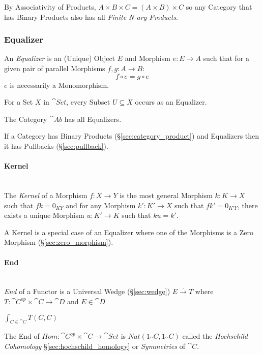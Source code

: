 By Associativity of Products, $A \times B \times C = (A \times B)
\times C$ so any Category that has Binary Products also has all
\emph{Finite N-ary Products}.



\subsubsection{Equalizer}\label{sec:equalizer}

An \emph{Equalizer} is an (Unique) Object $E$ and Morphism $e: E
\rightarrow A$ such that for a given pair of parallel Morphisms $f,g :
A \rightarrow B$:
\[
  f \circ e = g \circ e
\]
$e$ is necessarily a Monomorphism.

For a Set $X$ in $\cat{Set}$, every Subset $U \subseteq X$ occurs
as an Equalizer.

The Category $\cat{Ab}$ has all Equalizers.

If a Category has Binary Products (\S\ref{sec:category_product}) and
Equalizers then it has Pullbacks (\S\ref{sec:pullback}).



\paragraph{Kernel}\label{sec:morphism_kernel}
\hfill \\

The \emph{Kernel} of a Morphism $f : X \rightarrow Y$ is the most
general Morphism $k : K \rightarrow X$ such that $fk = 0_{KY}$ and for
any Morphism $k' : K' \rightarrow X$ such that $fk' = 0_{K'Y}$, there
exists a unique Morphism $u : K' \rightarrow K$ such that $ku = k'$.

A Kernel is a special case of an Equalizer where one of the Morphisms
is a Zero Morphism (\S\ref{sec:zero_morphism}).



\paragraph{End}\label{sec:end}
\hfill \\

\emph{End} of a Functor is a Universal Wedge (\S\ref{sec:wedge}) $E
\xrightarrow{.} T$ where $T : \cat{C}^{op} \times \cat{C}
\rightarrow \cat{D}$ and $E \in \cat{D}$

$\int_{C \in \cat{C}} T(C,C)$

The End of $Hom : \cat{C}^{op} \times \cat{C} \rightarrow
\cat{Set}$ is $Nat (1_\cat{C},1_\cat{C})$ called the
\emph{Hochschild Cohomology} \S\ref{sec:hochschild_homology} or
\emph{Symmetries} of $\cat{C}$.

